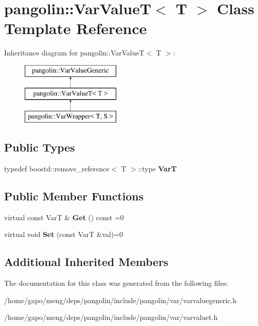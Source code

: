 \hypertarget{classpangolin_1_1_var_value_t}{}\section{pangolin\+:\+:Var\+ValueT$<$ T $>$ Class Template Reference}
\label{classpangolin_1_1_var_value_t}
Inheritance diagram for pangolin\+:\+:Var\+ValueT$<$ T $>$\+:\begin{figure}[H]
\begin{center}
\leavevmode
\includegraphics[height=3.000000cm]{classpangolin_1_1_var_value_t}
\end{center}
\end{figure}
\subsection*{Public Types}
\begin{DoxyCompactItemize}
\item 
typedef boostd\+::remove\+\_\+reference$<$ T $>$\+::type {\bfseries VarT}\hypertarget{classpangolin_1_1_var_value_t_a74a755384600d406c5df0e519200caab}{}\label{classpangolin_1_1_var_value_t_a74a755384600d406c5df0e519200caab}

\end{DoxyCompactItemize}
\subsection*{Public Member Functions}
\begin{DoxyCompactItemize}
\item 
virtual const VarT \& {\bfseries Get} () const =0\hypertarget{classpangolin_1_1_var_value_t_a740b8124933259b8f6519f991346ff00}{}\label{classpangolin_1_1_var_value_t_a740b8124933259b8f6519f991346ff00}

\item 
virtual void {\bfseries Set} (const VarT \&val)=0\hypertarget{classpangolin_1_1_var_value_t_ae65d54ce8864eeef923af95cd46432d9}{}\label{classpangolin_1_1_var_value_t_ae65d54ce8864eeef923af95cd46432d9}

\end{DoxyCompactItemize}
\subsection*{Additional Inherited Members}


The documentation for this class was generated from the following files\+:\begin{DoxyCompactItemize}
\item 
/home/gapo/meng/deps/pangolin/include/pangolin/var/varvaluegeneric.\+h\item 
/home/gapo/meng/deps/pangolin/include/pangolin/var/varvaluet.\+h\end{DoxyCompactItemize}
